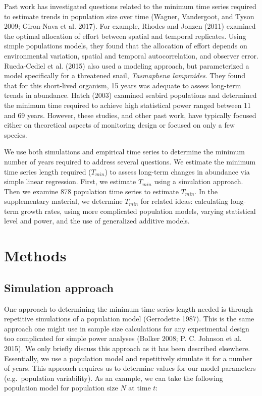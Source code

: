 \documentclass[12pt,]{article}
\begin{document}
Past work has investigated questions related to the minimum time series
required to estimate trends in population size over time (Wagner,
Vandergoot, and Tyson 2009; Giron-Nava et al. 2017). For example, Rhodes
and Jonzen (2011) examined the optimal allocation of effort between
spatial and temporal replicates. Using simple populations models, they
found that the allocation of effort depends on environmental variation,
spatial and temporal autocorrelation, and observer error. Rueda-Cediel
et al. (2015) also used a modeling approach, but parameterized a model
specifically for a threatened snail, \emph{Tasmaphena lamproides}. They
found that for this short-lived organism, 15 years was adequate to
assess long-term trends in abundance. Hatch (2003) examined seabird
populations and determined the minimum time required to achieve high
statistical power ranged between 11 and 69 years. However, these
studies, and other past work, have typically focused either on
theoretical aspects of monitoring design or focused on only a few
species.

We use both simulations and empirical time series to determine the
minimum number of years required to address several questions. We
estimate the minimum time series length required (\(T_{min}\)) to assess
long-term changes in abundance via simple linear regression. First, we
estimate \(T_{min}\) using a simulation approach. Then we examine 878
population time series to estimate \(T_{min}\). In the supplementary
material, we determine \(T_{min}\) for related ideas: calculating
long-term growth rates, using more complicated population models,
varying statistical level and power, and the use of generalized additive
models.

\section{Methods}\label{methods}

\subsection{Simulation approach}\label{simulation-approach}

One approach to determining the minimum time series length needed is
through repetitive simulations of a population model (Gerrodette 1987).
This is the same approach one might use in sample size calculations for
any experimental design too complicated for simple power analyses
(Bolker 2008; P. C. Johnson et al. 2015). We only briefly discuss this
approach as it has been described elsewhere. Essentially, we use a
population model and repetitively simulate it for a number of years.
This approach requires us to determine values for our model parameters
(e.g.~population variability). As an example, we can take the following
population model for population size \(N\) at time \(t\):
\end{document}
